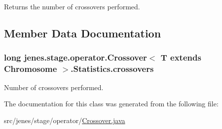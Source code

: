 \begin{DoxyReturn}{Returns}
the number of crossovers performed. 
\end{DoxyReturn}


\subsection{Member Data Documentation}
\hypertarget{classjenes_1_1stage_1_1operator_1_1_crossover_3_01_t_01extends_01_chromosome_01_4_1_1_statistics_abf1983cc628b3283b942dc68cc871bbc}{
\subsubsection[{crossovers}]{\setlength{\rightskip}{0pt plus 5cm}long jenes.\-stage.\-operator.\-Crossover$<$ T extends Chromosome $>$.Statistics.\-crossovers\hspace{0.3cm}{\ttfamily [protected]}}}\label{classjenes_1_1stage_1_1operator_1_1_crossover_3_01_t_01extends_01_chromosome_01_4_1_1_statistics_abf1983cc628b3283b942dc68cc871bbc}
Number of crossovers performed. 

The documentation for this class was generated from the following file\-:\begin{DoxyCompactItemize}
\item 
src/jenes/stage/operator/\hyperlink{_crossover_8java}{Crossover.\-java}\end{DoxyCompactItemize}

